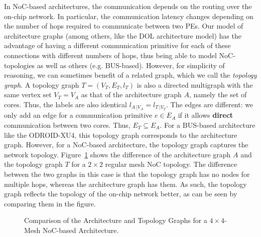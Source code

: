 In \ac{NoC}-based architectures, the communication depends on the routing over the on-chip network.
In particular, the communication latency changes depending on the number of hops required to communicate between two \acp{PE}.
Our model of architecture graphs (among others, like the DOL architecture model) has the advantage of having a different communication primitive for each of these connections with different numbers of hops, thus being able to model \ac{NoC}-topologies as well as others (e.g. BUS-based).
However, for simplicity of reasoning, we can sometimes benefit of a related graph, which we call the \emph{topology graph}\cite{goens_mcsoc18}.
A topology graph $T = (V_T,E_T,l_T)$ is also a directed multigraph with the same vertex set $V_T = V_A$ as that of the architecture graph $A$, namely the set of cores.
Thus, the labels are also identical $l_{A~ \big| V_A} = l_{T~ \big| V_T}$.
The edges are different: we only add an edge for a communication primitive $e \in E_A$ if it allows \textbf{direct} communication between two cores. Thus, $E_T \subseteq E_A$.
For a BUS-based architecture like the ODROID-XU4, this topology graph corresponds to the architecture graph. However, for a \ac{NoC}-based architecture, the topology graph captures the network topology.
Figure~\ref{fig:arch_graph_vs_topology} shows the difference of the architecture graph $A$ and the topology graph $T$ for a $2 \times 2$ regular mesh NoC topology.
The difference between the two graphs in this case is that the topology graph has no nodes for multiple hops, whereas the architecture graph has them.
As such, the topology graph reflects the topology of the on-chip network better, as can be seen by comparing them in the figure.

\begin{figure}[h]
	\centering
\resizebox{0.95\textwidth}{!}{
   \begin{tikzpicture}
     
   \end{tikzpicture}
 }
   \caption{Comparison of the Architecture and Topology Graphs for a $4 \times 4$-Mesh NoC-based Architecture.}
   \label{fig:arch_graph_vs_topology}
\end{figure}

